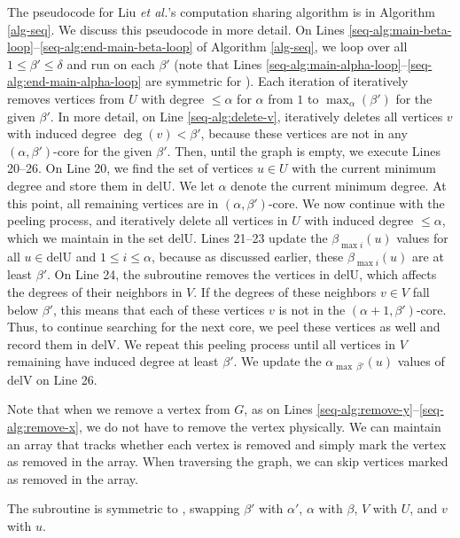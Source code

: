 The pseudocode for Liu \textit{et al.}'s computation sharing algorithm is in Algorithm \ref{alg-seq}. We discuss this pseudocode in more detail.
On Lines \ref{seq-alg:main-beta-loop}--\ref{seq-alg:end-main-beta-loop} of Algorithm \ref{alg-seq}, we loop over all $1\le\beta'\le\delta$ and run  on each $\beta'$ (note that Lines \ref{seq-alg:main-alpha-loop}--\ref{seq-alg:end-main-alpha-loop} are symmetric for ). Each iteration of  iteratively removes vertices from $U$ with degree $\le\alpha$ for $\alpha$ from $1$ to $\max_\alpha(\beta')$ for the given $\beta'$. 
In more detail, 
on Line \ref{seq-alg:delete-v},  iteratively deletes all vertices $v$ with induced degree $\deg(v)<\beta'$, because these vertices are not in any $(\alpha,\beta')$-core for the given $\beta'$. Then, until the graph is empty, we execute Lines 20--26. On Line 20, we find the set of vertices $u \in U$ with the current minimum degree and store them in $\text{delU}$. We let $\alpha$ denote the current minimum degree. At this point, all remaining vertices are in $(\alpha,\beta')$-core. 
We now continue with the peeling process, and iteratively delete all vertices in $U$ with induced degree $\le \alpha$, which we maintain in the set $\text{delU}$. Lines 21--23 update the $\beta_{\max i}(u)$ values for all $u \in \text{delU}$ and $1\le i\le \alpha$, because as discussed earlier, these $\beta_{\max i}(u)$ are at least $\beta'$. On Line 24, the  subroutine removes the vertices in $\text{delU}$, which affects the degrees of their neighbors in $V$. If the degrees of these neighbors $v \in V$ fall below
$\beta'$, this means that each of these vertices $v$ is not in the $(\alpha+1,\beta')$-core. Thus, to continue searching for the next core, we peel these vertices as well and record them in $\text{delV}$. We repeat this peeling process until all vertices in $V$ remaining have induced degree at least $\beta'$.
We update the $\alpha_{\max\ \beta'}(u)$ values of $\text{delV}$ on Line 26.

Note that when we remove a vertex from $G$, as on Lines \ref{seq-alg:remove-y}--\ref{seq-alg:remove-x}, we do not have to remove the vertex physically. We can maintain an array that tracks whether each vertex is removed and simply mark the vertex as removed in the array. When traversing the graph, we can skip vertices marked as removed in the array.

The  subroutine is symmetric to , swapping $\beta'$ with $\alpha'$, $\alpha$ with $\beta$, $V$ with $U$, and $v$ with $u$. 

